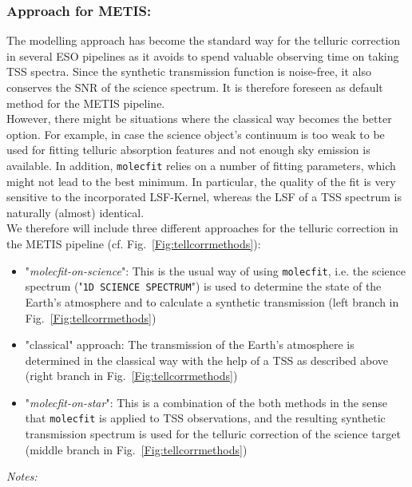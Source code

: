 {\subsubsection{Approach for METIS:}
The modelling approach has become the standard way for the telluric correction in several ESO pipelines as it avoids to spend valuable observing time on taking \ac{TSS} spectra. Since the synthetic transmission function is noise-free, it also conserves the \ac{SNR} of the science spectrum. It is therefore  foreseen as default method for the \ac{METIS} pipeline.\\
However, there might be situations where the classical way becomes the better option. For example, in case the science object's continuum is too weak to be used for fitting telluric absorption features and not enough sky emission is available. In addition, \texttt{molecfit} relies on a number of fitting parameters, which might not lead to the best minimum. In particular, the quality of the fit is very sensitive to the incorporated \ac{LSF}-Kernel, whereas the \ac{LSF} of a \ac{TSS} spectrum is naturally (almost) identical.\\
We therefore will include three different approaches for the telluric correction in the \ac{METIS} pipeline (cf. Fig.~\ref{Fig:tellcorrmethods}):
\begin{itemize}
    \item "\textit{molecfit-on-science}": This is the usual way of using \texttt{molecfit}, i.e. the science spectrum ("\texttt{1D SCIENCE SPECTRUM}") is used to determine the state of the Earth's atmosphere and to calculate a synthetic transmission (left branch in Fig.~\ref{Fig:tellcorrmethods})
    \item "classical" approach: The transmission of the Earth's atmosphere is determined in the classical way with the help of a \ac{TSS} as described above (right branch in Fig.~\ref{Fig:tellcorrmethods})
    \item "\textit{molecfit-on-star}": This is a combination of the both methods in the sense that \texttt{molecfit} is applied to \ac{TSS} observations, and the resulting synthetic transmission spectrum is used for the telluric correction of the science target  (middle branch in Fig.~\ref{Fig:tellcorrmethods})
\end{itemize}
\textit{Notes:}\\
}
